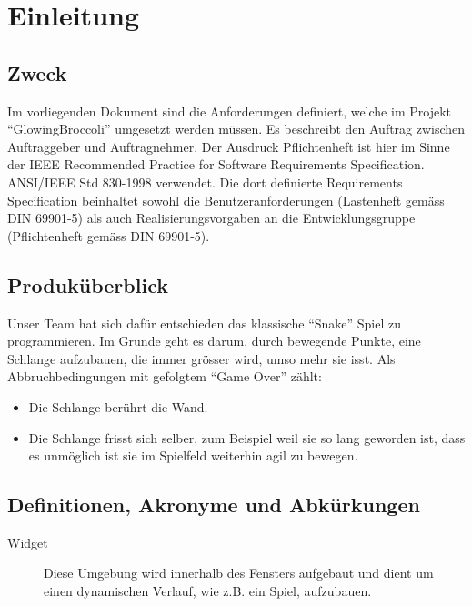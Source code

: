 \documentclass[a4paper, twosided, 11pt]{scrartcl}
\begin{document}
\clearpage
\tableofcontents
\listoffigures
\listoftables

\clearpage

\section{Einleitung}
\subsection{Zweck}

Im vorliegenden Dokument sind die Anforderungen definiert, welche im Projekt
``GlowingBroccoli'' umgesetzt werden müssen. Es beschreibt den Auftrag zwischen
Auftraggeber und Auftragnehmer. Der Ausdruck Pflichtenheft ist hier im Sinne
der IEEE Recommended Practice for Software Requirements Specification.
ANSI/IEEE Std 830-1998 verwendet. Die dort definierte Requirements
Specification beinhaltet sowohl die Benutzeranforderungen (Lastenheft gemäss
DIN 69901-5) als auch Realisierungsvorgaben an die Entwicklungsgruppe
(Pflichtenheft gemäss DIN 69901-5).

\subsection{Produk\"uberblick}
Unser Team hat sich dafür entschieden das klassische ``Snake'' Spiel zu
programmieren. Im Grunde geht es darum, durch bewegende Punkte, eine Schlange
aufzubauen, die immer grösser wird, umso mehr sie isst.
Als Abbruchbedingungen mit gefolgtem ``Game Over'' zählt:
\begin{itemize}
  \item Die Schlange berührt die Wand.
  \item Die Schlange frisst sich selber, zum Beispiel weil sie so lang geworden
    ist, dass es unmöglich ist sie im Spielfeld weiterhin agil zu bewegen.
\end{itemize}

\subsection{Definitionen, Akronyme und Abk\"urkungen}

\begin{description}
  \item[Widget] Diese Umgebung wird innerhalb des Fensters aufgebaut und dient
    um einen dynamischen Verlauf, wie z.B. ein Spiel, aufzubauen.
\end{description}
\end{document}
